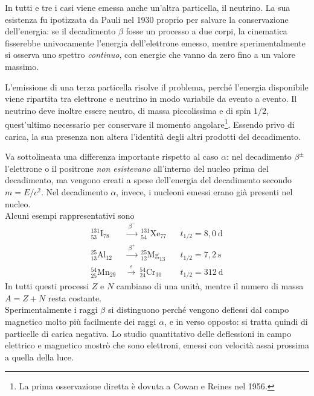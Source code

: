 In tutti e tre i casi viene emessa anche un'altra particella, il neutrino. La sua esistenza fu ipotizzata da Pauli nel 1930 proprio per salvare la conservazione dell'energia: se il decadimento $\beta$ fosse un processo a due corpi, la cinematica fisserebbe univocamente l'energia dell'elettrone emesso, mentre sperimentalmente si osserva uno spettro \emph{continuo}, con energie che vanno da zero fino a un valore massimo. 

L'emissione di una terza particella risolve il problema, perché l'energia disponibile viene ripartita tra elettrone e neutrino in modo variabile da evento a evento. Il neutrino deve inoltre essere neutro, di massa piccolissima e di spin $1/2$, quest'ultimo necessario per conservare il momento angolare\footnote{La prima osservazione diretta è dovuta a Cowan e Reines nel 1956.}. Essendo privo di carica, la sua presenza non altera l'identità degli altri prodotti del decadimento. 


Va sottolineata una differenza importante rispetto al caso $\alpha$: nel decadimento $\beta^\pm$ l'elettrone o il positrone \emph{non esistevano} all'interno del nucleo prima del decadimento, ma vengono creati a spese dell'energia del decadimento secondo $m = E/c^2$. Nel decadimento $\alpha$, invece, i nucleoni emessi erano già presenti nel nucleo.\\

Alcuni esempi rappresentativi sono
%
\begin{equation*}
\begin{aligned}
    {}^{131}_{53}\mathrm{I}_{78} \ &\xrightarrow{\ \beta^- \ } \ {}^{131}_{54}\mathrm{Xe}_{77} && t_{1/2} = 8,0 \ \mathrm{d} \\
    {}^{25}_{13}\mathrm{Al}_{12} \ &\xrightarrow{\ \beta^+ \ } \ {}^{25}_{12}\mathrm{Mg}_{13} && t_{1/2} = 7,2 \ \mathrm{s} \\
    {}^{54}_{25}\mathrm{Mn}_{29} \ &\xrightarrow{\ \varepsilon \ } \ {}^{54}_{24}\mathrm{Cr}_{30} && t_{1/2} = 312 \ \mathrm{d}
\end{aligned}
\end{equation*}
In tutti questi processi $Z$ e $N$ cambiano di una unità, mentre il numero di massa $A = Z + N$ resta costante.\\

Sperimentalmente i raggi $\beta$ si distinguono perché vengono deflessi dal campo magnetico molto più facilmente dei raggi $\alpha$, e in verso opposto: si tratta quindi di particelle di carica negativa. Lo studio quantitativo delle deflessioni in campo elettrico e magnetico mostrò che sono elettroni, emessi con velocità assai prossima a quella della luce. 

